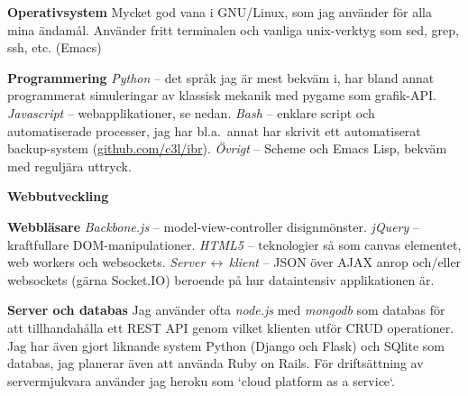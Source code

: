 

\label{programming}


\newenvironment{myitemize}{%
  \let\olditem\item
  \renewcommand\item[1][]{\olditem \textbf{##1}\hspace{0.35em}}
  \begin{list}{}{%
    \setlength{\leftmargin}{1.5em}
    \setlength{\itemsep}{0.25em}
    \setlength{\parskip}{0em}
    \setlength{\parsep}{0.25em}
  }
}{%
  \end{list}
}

\begin{myitemize}
  \item[Operativsystem]
    Mycket god vana i GNU/Linux, som jag använder för alla mina
    ändamål. Använder fritt terminalen och vanliga unix-verktyg som
    sed, grep, ssh, etc. (Emacs)

  \item[Programmering]
    \emph{Python} -- det språk jag är mest bekväm i, har bland annat
    programmerat simuleringar av klassisk mekanik med pygame som
    grafik-API.
    \emph{Javascript} -- webapplikationer, se nedan.
    \emph{Bash} -- enklare script och automatiserade processer, jag
    har bl.a.\ annat har skrivit ett automatiserat backup-system
    (\url{github.com/c3l/ibr}).
    \emph{Övrigt} -- Scheme och Emacs Lisp, bekväm med reguljära uttryck.

  \item[Webbutveckling]
    \begin{list}{}{%
      \setlength{\leftmargin}{1.5em}
      \setlength{\itemsep}{0em}
      \setlength{\parskip}{0em}
      \setlength{\parsep}{0.25em}
    }
      \item[Webbläsare]
        \emph{Backbone.js} -- model-view-controller disignmönster.
        \emph{jQuery} -- kraftfullare DOM-manipulationer.
        \emph{HTML5} -- teknologier så som canvas elementet, web workers och websockets.
        \emph{Server$\,\leftrightarrow\,$klient} -- JSON över AJAX anrop och/eller websockets
        (gärna Socket.IO) beroende på hur dataintensiv applikationen är.
      \item[Server och databas]
        Jag använder ofta \emph{node.js} med \emph{mongodb} som
        databas för att tillhandahålla ett REST API genom vilket
        klienten utför CRUD operationer. Jag har även gjort liknande
        system Python (Django och Flask) och SQlite som databas, jag
        planerar även att använda Ruby on Rails. För driftsättning av
        servermjukvara använder jag heroku som `cloud platform as a
        service`.
    \end{list}


\end{myitemize}
